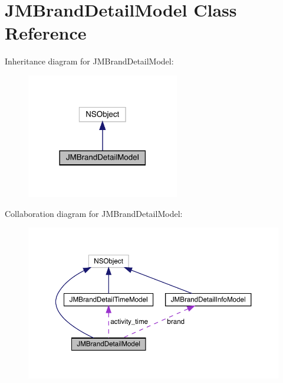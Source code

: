 \hypertarget{interface_j_m_brand_detail_model}{}\section{J\+M\+Brand\+Detail\+Model Class Reference}
\label{interface_j_m_brand_detail_model}


Inheritance diagram for J\+M\+Brand\+Detail\+Model\+:\nopagebreak
\begin{figure}[H]
\begin{center}
\leavevmode
\includegraphics[width=189pt]{interface_j_m_brand_detail_model__inherit__graph}
\end{center}
\end{figure}


Collaboration diagram for J\+M\+Brand\+Detail\+Model\+:\nopagebreak
\begin{figure}[H]
\begin{center}
\leavevmode
\includegraphics[width=350pt]{interface_j_m_brand_detail_model__coll__graph}
\end{center}
\end{figure}
